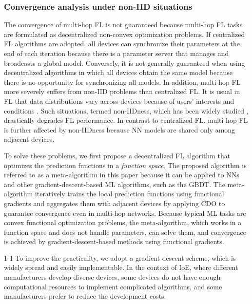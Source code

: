 \documentclass[journal]{IEEEtran}
\begin{document}
\subsubsection*{Convergence analysis under non-IID situations}
The convergence of multi-hop \gls{FL} is not guaranteed
because multi-hop \gls{FL} tasks are formulated as decentralized non-convex optimization problems.
If centralized \gls{FL} algorithms are adopted,
all devices can synchronize their parameters at the end of each iteration
because there is a parameter server that manages and broadcasts a global model.
Conversely, it is not generally guaranteed when using decentralized algorithms in which all devices obtain the same model
because there is no opportunity for synchronizing all models.
In addition, multi-hop \gls{FL} more severely suffers from non-\gls{IID} problems than centralized \gls{FL}.
It is usual in \gls{FL} that data distributions vary across devices because of users' interests and conditions \cite{kairouz2019advances}.
Such situations, termed non-\gls{IID}ness, which has been widely studied \cite{zhao2018federated,sattler2020robust,li2020convergence},
drastically degrades \gls{FL} performance.
In contrast to centralized \gls{FL},
multi-hop \gls{FL} is further affected by non-\gls{IID}ness because \gls{NN} models are shared only among adjacent devices.

To solve these problems, we first propose a decentralized \gls{FL} algorithm
that optimizes the prediction functions in a \textit{function space}.
The proposed algorithm is referred to as a meta-algorithm in this paper
because it can be applied to \glspl{NN} and other gradient-descent-based \gls{ML} algorithms, such as the \gls{GBDT}.
The meta-algorithm iteratively trains the local prediction functions using functional gradients
and aggregates them with adjacent devices by applying \gls{CDO} to guarantee convergence even in multi-hop networks.
Because typical \gls{ML} tasks are convex functional optimization problems,
the meta-algorithm, which works in a function space and does not handle parameters,
can solve them, and convergence is achieved by gradient-descent-based methods using functional gradients.

\begin{revhl}{1-1}
To improve the practicality, we adopt a gradient descent scheme, which is widely spread and easily implementable.
In the context of \gls{IoE}, where different manufacturers develop diverse devices,
some devices do not have enough computational resources to implement complicated algorithms,
and some manufacturers prefer to reduce the development costs.
\end{revhl}
\end{document}
